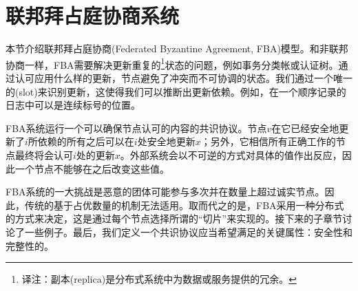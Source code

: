 \section{联邦拜占庭协商系统}\label{sec:fba}

本节介绍联邦拜占庭协商(Federated Byzantine Agreement, FBA)模型。和非联邦协商一样，FBA需要解决更新重复的\footnote{译注：副本(replica)是分布式系统中为数据或服务提供的冗余。}状态的问题，例如事务分类帐或认证树。通过认可应用什么样的更新，节点避免了冲突而不可协调的状态。我们通过一个唯一的{\slot}(slot)来识别更新，这使得我们可以推断出更新依赖。例如，在一个顺序记录的日志中{\slot}可以是连续标号的位置。

FBA系统运行一个可以确保节点认可{\slot}的内容的共识协议。节点$v$在它已经安全地更新了{\slot}$i$所依赖的所有{\slot}之后可以在{\slot}$i$处安全地更新$x$；另外，它相信所有正确工作的节点最终将会认可{\slot}$i$处的更新$x$。外部系统会以不可逆的方式对具体的值作出反应，因此一个节点不能够在之后改变这些值。

FBA系统的一大挑战是恶意的团体可能参与多次并在数量上超过诚实节点。因此，传统的基于占优数量的{\quorum}机制无法适用。取而代之的是，FBA采用一种分布式的方式来决定{\quorum}，这是通过每个节点选择所谓的``{\quorum}切片''来实现的。接下来的子章节讨论了一些例子。最后，我们定义一个共识协议应当希望满足的关键属性：安全性和完整性的。



